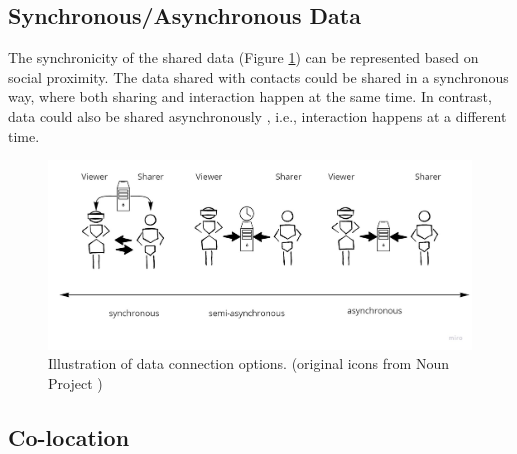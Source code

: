 

\subsection{Synchronous/Asynchronous Data}

The synchronicity of the shared data (Figure \ref{fig:continuum:data-connection}) can be represented based on social proximity. The data shared with contacts could be shared in a synchronous way, where both sharing and interaction happen at the same time. In contrast, data could also be shared asynchronously \cite{Smith2016}, i.e., interaction happens at a different time. 

\begin{figure}[ht]
    \centering
    \includegraphics[width=0.8\linewidth]{images/30-continuum/continuum-connection.jpg}
    \caption{Illustration of data connection options. (original icons from Noun Project \cite{TheNounProjectInc.})}
    \label{fig:continuum:data-connection}
\end{figure}

\subsection{Co-location}


